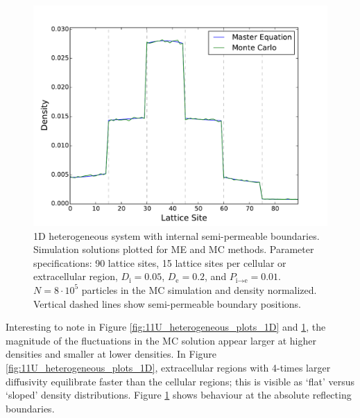 	\begin{figure}[h]
		\centering
		\includegraphics[width=1.0\linewidth]{../images/1D/3U_heterogeneous_plots_1D}
		\caption[1D: MC and ME solutions for a smaller heterogeneous system]{1D heterogeneous system with internal semi-permeable boundaries. Simulation solutions plotted for ME and MC methods. Parameter specifications: 90 lattice sites, 15 lattice sites per cellular or extracellular region, $ D_\textrm{i} = 0.05 $, $ D_\textrm{e} = 0.2 $, and $ P_{\textrm{i}\rightarrow \textrm{e}} = 0.01 $. $ N = 8 \cdot 10^5 $ particles in the MC simulation and density normalized. Vertical dashed lines show semi-permeable boundary positions.}
		\label{fig:3U_heterogeneous_plots_1D}
	\end{figure}
	
	\newpage
	Interesting to note in Figure \ref{fig:11U_heterogeneous_plots_1D} and \ref{fig:3U_heterogeneous_plots_1D}, the magnitude of the fluctuations in the MC solution appear larger at higher densities and smaller at lower densities. In Figure \ref{fig:11U_heterogeneous_plots_1D}, extracellular regions with 4-times larger diffusivity equilibrate faster than the cellular regions; this is visible as `flat' versus `sloped' density distributions. Figure \ref{fig:3U_heterogeneous_plots_1D} shows behaviour at the absolute reflecting boundaries.
	
